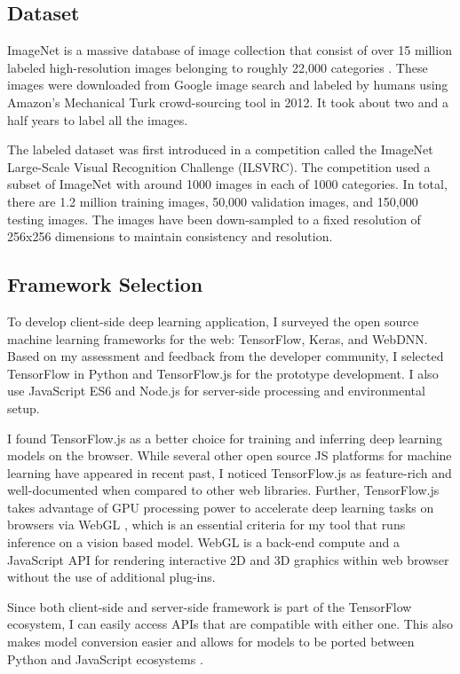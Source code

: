 \subsection{Dataset}

ImageNet is a massive database of image collection that consist of over 15 million labeled high-resolution images belonging to roughly 22,000 categories \cite{edsarx.1409.057520140101}. These images were downloaded from Google image search and labeled by humans using Amazon’s Mechanical Turk crowd-sourcing tool in 2012. It took about two and a half years to label all the images. 

The labeled dataset was first introduced in a competition called the ImageNet Large-Scale Visual Recognition Challenge (ILSVRC). The competition used a subset of ImageNet with around 1000 images in each of 1000 categories. In total, there are 1.2 million training images, 50,000 validation images, and 150,000 testing images. The images have been down-sampled to a fixed resolution of 256x256 dimensions to maintain consistency and resolution.
    
\subsection{Framework Selection}

To develop client-side deep learning application, I surveyed the open source machine learning frameworks for the web: TensorFlow, Keras, and WebDNN. Based on my assessment and feedback from the developer community, I selected TensorFlow in Python and TensorFlow.js for the prototype development. I also use JavaScript ES6 and Node.js for server-side processing and environmental setup.

I found TensorFlow.js as a better choice for training and inferring deep learning models on the browser. While several other open source JS platforms for machine learning have appeared in recent past, I noticed TensorFlow.js as feature-rich and well-documented when compared to other web libraries. Further, TensorFlow.js takes advantage of GPU processing power to accelerate deep learning tasks on browsers via WebGL \cite{Ma2019}, which is an essential criteria for my tool that runs inference on a vision based model. WebGL is a back-end compute and a JavaScript API for rendering interactive 2D and 3D graphics within web browser without the use of additional plug-ins.

Since both client-side and server-side framework is part of the TensorFlow ecosystem, I can easily access APIs that are compatible with either one. This also makes model conversion easier and allows for models to be ported between Python and JavaScript ecosystems \cite{Smilkov2019}.

